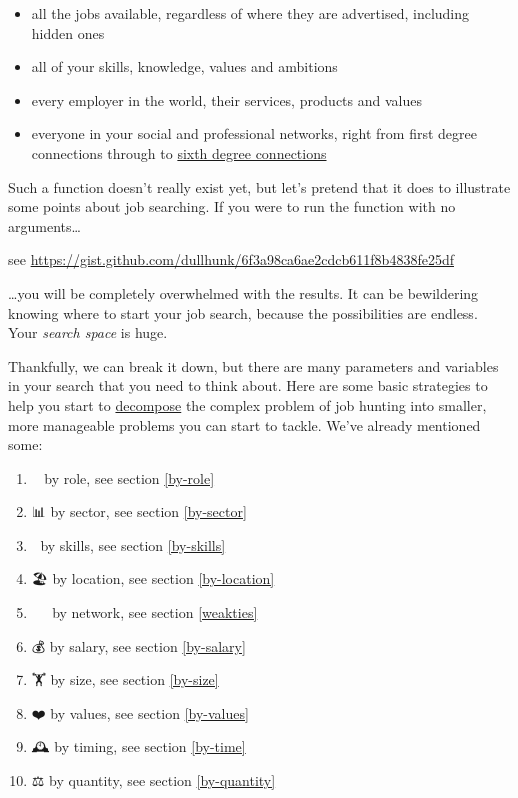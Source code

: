 \documentclass[
]{book}
\providecommand{\tightlist}{%
  \setlength{\itemsep}{0pt}\setlength{\parskip}{0pt}}
\begin{document}
\begin{itemize}
\tightlist
\item
  all the jobs available, regardless of where they are advertised, including hidden ones
\item
  all of your skills, knowledge, values and ambitions
\item
  every employer in the world, their services, products and values
\item
  everyone in your social and professional networks, right from first degree connections through to \href{https://en.wikipedia.org/wiki/Six_degrees_of_separation}{sixth degree connections} \citep{bacon}
\end{itemize}

Such a function doesn't really exist yet, but let's pretend that it does to illustrate some points about job searching. If you were to run the function with no arguments\ldots{}

see \url{https://gist.github.com/dullhunk/6f3a98ca6ae2cdcb611f8b4838fe25df}

\ldots you will be completely overwhelmed with the results. It can be bewildering knowing where to start your job search, because the possibilities are endless. Your \emph{search space} is huge.

Thankfully, we can break it down, but there are many parameters and variables in your search that you need to think about. Here are some basic strategies to help you start to \href{https://en.wikipedia.org/wiki/Decomposition_(computer_science)}{decompose} the complex problem of job hunting into smaller, more manageable problems you can start to tackle. We've already mentioned some:

\begin{enumerate}
\def\labelenumi{\arabic{enumi}.}
\tightlist
\item
  👨‍🔬 by role, see section \ref{by-role}
\item
  📊 by sector, see section \ref{by-sector}
\item
  💪 by skills, see section \ref{by-skills}
\item
  🏖️ by location, see section \ref{by-location}
\item
  👨‍👩‍👧‍👦 by network, see section \ref{weakties}
\item
  💰 by salary, see section \ref{by-salary}
\item
  🏋️ by size, see section \ref{by-size}
\item
  ❤️ by values, see section \ref{by-values}
\item
  🕰 by timing, see section \ref{by-time}
\item
  ⚖️ by quantity, see section \ref{by-quantity}
\end{enumerate}
\end{document}
